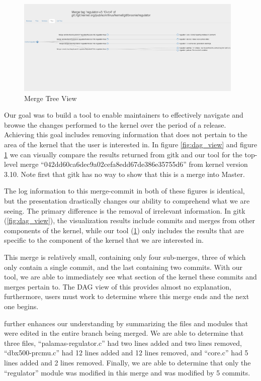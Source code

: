 \documentclass[conference, draftclsnofoot, draft]{IEEEtran}
\begin{document}
\begin{figure}
        \centering
        \includegraphics[width=0.97\textwidth]{figures/042dd_tree.png}
        \caption{Merge Tree View }
        \label{fig:tree_view}
\end{figure}

Our goal was to build a tool to enable maintainers to effectively navigate and browse
the changes performed to the kernel over the period of a release.
Achieving this goal includes removing information that does not pertain to the area
of the kernel that the user is interested in. In figure \ref{fig:dag_view} and
figure \ref{fig:tree_view} we can visually compare the results returned from gitk
and our tool for the top-level merge ``042dd60ca6dec9a02cefa8edd67de386e35755d6''
from kernel version 3.10. Note first that gitk has no way to show that this is a merge into Master.

The log information to this merge-commit in both of these
figures is identical, but the presentation drastically changes our ability to
comprehend what we are seeing. The primary difference is the removal of irrelevant
information. In gitk (\ref{fig:dag_view}), the visualization results include commits
and merges from other components of the kernel, while our tool (\ref{fig:tree_view})
only includes the results that are specific to the component of the kernel that we
are interested in.

This merge is relatively small, containing only four sub-merges, three of which
only contain a single commit, and the last containing two commits. With our
tool, we are able to immediately see what section of the kernel these commits and merges pertain to. The DAG view of this provides almost no explanation,
furthermore, users must work to determine where this merge ends and the next one
begins.

\tool further enhances our understanding by summarizing the files
and modules that were edited in the entire branch being merged. We are able to determine that three
files, ``palamas-regulator.c'' had two lines added and two lines removed,
``dbx500-prcmu.c'' had 12 lines added and 12 lines removed, and ``core.c'' had 5
lines added and 2 lines removed. Finally, we are able to determine that only the
``regulator'' module was modified in this merge and was modified by 5 commits.
\end{document}
